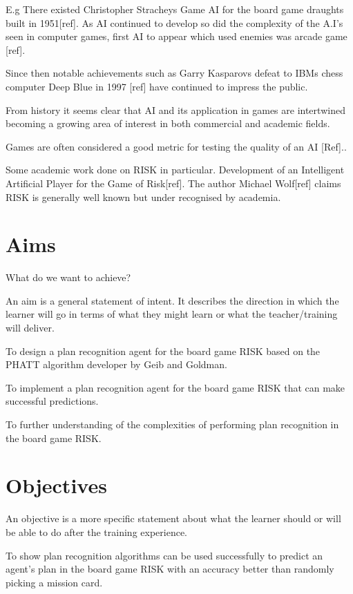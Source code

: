 \documentclass[parskip]{cs4rep}
\begin{document}
E.g
There existed Christopher Stracheys Game AI for the board game draughts built in 1951[ref]. As AI continued to develop so did the complexity of the A.I's seen in computer games, first AI to appear which used enemies was arcade game [ref].

Since then notable achievements such as Garry Kasparovs defeat to IBMs chess computer Deep Blue in 1997 [ref] have continued to impress the public. 

From history it seems clear that AI and its application in games are intertwined becoming a growing area of interest in both commercial and academic fields.

Games are often considered a good metric for testing the quality of an AI [Ref].. 

Some academic work done on RISK in particular. Development of an Intelligent Artificial Player for the Game of Risk[ref]. The author Michael Wolf[ref] claims RISK is generally well known but under recognised by academia.

\section{Aims}

What do we want to achieve?

An aim is a general statement of intent. It describes the direction in which the learner will go in terms of what they might learn or what the teacher/training will deliver.

To design a plan recognition agent for the board game RISK based on the PHATT algorithm developer by Geib and Goldman.

To implement a plan recognition agent for the board game RISK that can make successful predictions.

To further understanding of the complexities of performing plan recognition in the board game RISK.

\section{Objectives}

An objective is a more specific statement about what the learner should or will be able to do after the training experience.

To show plan recognition algorithms can be used successfully to predict an agent's plan in the board game RISK with an accuracy better than randomly picking a mission card.
\end{document}
